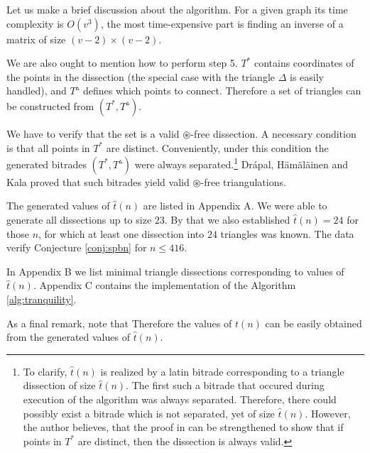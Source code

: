 Let us make a brief discussion about the algorithm. For a given graph its time complexity is $O(v^3)$, the most time-expensive part is finding an inverse of a matrix of size $(v-2)\times(v-2)$.

We are also ought to mention how to perform step 5. $T^*$ contains coordinates of the points in the dissection (the special case with the triangle $\Delta$ is easily handled), and $T^\vartriangle$ defines which points to connect. Therefore a set of triangles can be constructed from $(T^*,T^\vartriangle)$.

We have to verify that the set is a valid $\circledast$-free dissection. A necessary condition is that all points in $T^*$ are distinct. Conveniently, under this condition the generated bitrades $(T^*,T^\vartriangle)$ were always separated.\footnote{To clarify, $\hat t(n)$ is realized by a latin bitrade corresponding to a triangle dissection of size $\hat t(n)$. The first such a bitrade that occured during execution of the algorithm was always separated. Therefore, there could possibly exist a bitrade which is not separated, yet of size $\hat t(n)$. However, the author believes, that the proof in \cite{DrapalHamalainenKala10} can be strengthened to show that if points in $T^*$ are distinct, then the dissection is always valid.} Drápal, Hämäläinen and Kala \cite{DrapalHamalainenKala10} proved that such bitrades yield valid $\circledast$-free triangulations.

\bigskip

The generated values of $\hat t(n)$ are listed in Appendix A. We were able to generate all dissections up to size $23$. By that we also established $\hat t(n) = 24$ for those $n$, for which at least one dissection into $24$ triangles was known. The data verify Conjecture \ref{conj:spbn} for $n \leq 416$.

In Appendix B we list minimal triangle dissections corresponding to values of $\hat t(n)$. Appendix C contains the implementation of the Algorithm \ref{alg:tranquility}.

As a final remark, note that
%
Therefore the values of $t(n)$ can be easily obtained from the generated values of $\hat t(n)$.


